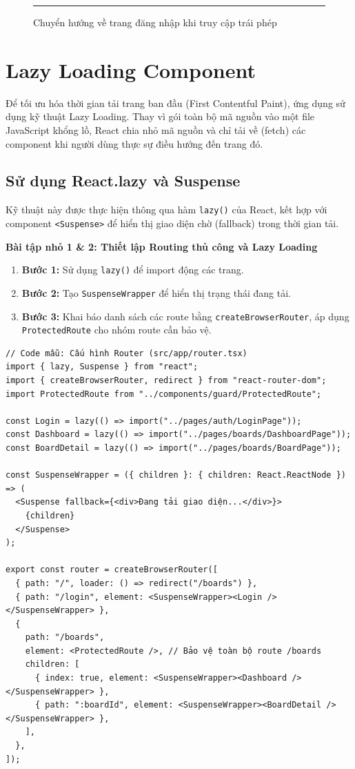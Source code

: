 \begin{figure}[H]
    \centering
    \rule{0.8\textwidth}{0.4\textwidth}
    \caption{Chuyển hướng về trang đăng nhập khi truy cập trái phép}
\end{figure}

\section{Lazy Loading Component}
Để tối ưu hóa thời gian tải trang ban đầu (First Contentful Paint), ứng dụng sử dụng kỹ thuật Lazy Loading. Thay vì gói toàn bộ mã nguồn vào một file JavaScript khổng lồ, React chia nhỏ mã nguồn và chỉ tải về (fetch) các component khi người dùng thực sự điều hướng đến trang đó.

\subsection{Sử dụng React.lazy và Suspense}
Kỹ thuật này được thực hiện thông qua hàm \texttt{lazy()} của React, kết hợp với component \texttt{<Suspense>} để hiển thị giao diện chờ (fallback) trong thời gian tải.

\textbf{Bài tập nhỏ 1 \& 2: Thiết lập Routing thủ công và Lazy Loading}
\begin{enumerate}
    \item \textbf{Bước 1:} Sử dụng \texttt{lazy()} để import động các trang.
    \item \textbf{Bước 2:} Tạo \texttt{SuspenseWrapper} để hiển thị trạng thái đang tải.
    \item \textbf{Bước 3:} Khai báo danh sách các route bằng \texttt{createBrowserRouter}, áp dụng \texttt{ProtectedRoute} cho nhóm route cần bảo vệ.
\end{enumerate}

\begin{Verbatim}
// Code mẫu: Cấu hình Router (src/app/router.tsx)
import { lazy, Suspense } from "react";
import { createBrowserRouter, redirect } from "react-router-dom";
import ProtectedRoute from "../components/guard/ProtectedRoute";

const Login = lazy(() => import("../pages/auth/LoginPage"));
const Dashboard = lazy(() => import("../pages/boards/DashboardPage"));
const BoardDetail = lazy(() => import("../pages/boards/BoardPage"));

const SuspenseWrapper = ({ children }: { children: React.ReactNode }) => (
  <Suspense fallback={<div>Đang tải giao diện...</div>}>
    {children}
  </Suspense>
);

export const router = createBrowserRouter([
  { path: "/", loader: () => redirect("/boards") },
  { path: "/login", element: <SuspenseWrapper><Login /></SuspenseWrapper> },
  {
    path: "/boards",
    element: <ProtectedRoute />, // Bảo vệ toàn bộ route /boards
    children: [
      { index: true, element: <SuspenseWrapper><Dashboard /></SuspenseWrapper> },
      { path: ":boardId", element: <SuspenseWrapper><BoardDetail /></SuspenseWrapper> },
    ],
  },
]);
\end{Verbatim}


